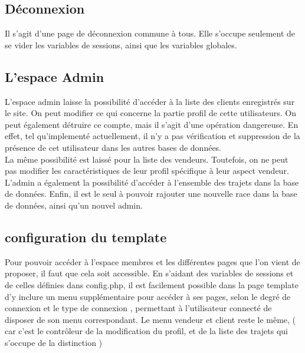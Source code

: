 \documentclass{article}
\begin{document}
\subsection{Déconnexion}
Il s'agit d'une page de déconnexion commune à tous. Elle s'occupe seulement de se vider les variables de sessions, ainsi que les variables globales. 

\subsection{L'espace Admin}

L'espace admin laisse la possibilité d'accéder à la liste des clients enregistrés sur le site. On peut modifier ce qui concerne la partie profil de cette utilisateurs. 
On peut également détruire ce compte, mais il s'agit d'une opération dangereuse. En effet, tel qu'implementé actuellement, il n'y a pas vérification et suppression de la présence de cet utilisateur dans les autres bases de données.
\\
La même possibilité est laissé pour la liste des vendeurs. Toutefois, on ne peut pas modifier les caractéristiques de leur profil spécifique à leur aspect vendeur. 
\\
L'admin a également la possibilité d'accéder à l'ensemble des trajets dans la base de données. 
Enfin, il est le seul à pouvoir rajouter une nouvelle race dans la base de données, ainsi qu'un nouvel admin.

\subsection{configuration du template}
Pour pouvoir accéder à l'espace membres et les différentes pages que l'on vient de proposer, il faut que cela soit accessible.  
En s'aidant des variables de sessions et de celles définies dans config.php, il est facilement possible dans la page template d'y inclure un menu supplémentaire pour accéder à ses pages, selon le degré de connexion et le type de connexion , permettant à l'utilisateur connecté de disposer de son menu correspondant. 
Le menu vendeur et client reste le même, ( car c'est le contrôleur de la modification du profil, et de la liste des trajets qui s'occupe de la distinction ) 
\end{document}
